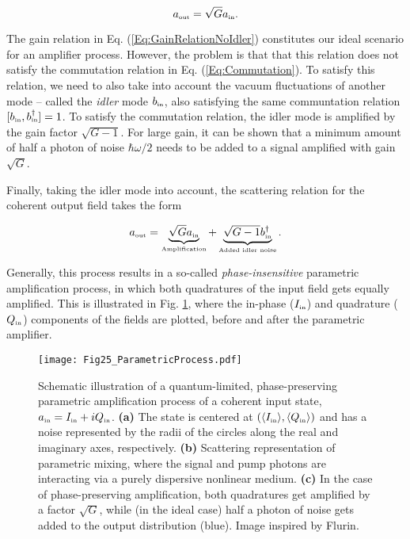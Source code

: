 \documentclass[aip,apr,twocolumn,showpacs,superscriptaddress,groupedaddress,nofootinbib,reprint]{revtex4-1}  %
\begin{document}
\begin{equation}
a_{\mbox{\tiny{out}}} = \sqrt{G}a_{\mbox{\tiny{in}}}.
\label{Eq:GainRelationNoIdler}
\end{equation}

The gain relation in Eq. (\ref{Eq:GainRelationNoIdler}) constitutes our ideal scenario for an amplifier process. However, the problem is that that this relation does not satisfy the commutation relation in Eq. (\ref{Eq:Commutation}). To satisfy this relation, we need to also take into account the vacuum fluctuations of another mode\cite{Shimoda1957,Clerk2003,Clerk2010,Bultink2018} -- called the \textit{idler} mode $b_{\mbox{\tiny{in}}}$, also satisfying the same communtation relation $[b_{\mbox{\tiny{in}}},b_{\mbox{\tiny{in}}}^{\dagger}] = 1$. To satisfy the commutation relation, the idler mode is amplified by the gain factor $\sqrt{G-1}$. For large gain, it can be shown that a minimum amount of half a photon of noise $\hbar \omega/2$ needs to be added to a signal amplified with gain $\sqrt{G}$.

Finally, taking the idler mode into account, the scattering relation for the coherent output field takes the form

\begin{equation}
a_{\mbox{\tiny{out}}} = \underbrace{\sqrt{G}a_{\mbox{\tiny{in}}}}_{\mbox{\tiny{Amplification}}} + \underbrace{\sqrt{G - 1}b_{\mbox{\tiny{in}}}^{\dagger}}_{\mbox{\tiny{Added idler noise}}}.
\label{Eq:GainRelation}
\end{equation}

Generally, this process results in a so-called \textit{phase-insensitive} parametric amplification process, in which both quadratures of the input field gets equally amplified. This is illustrated in Fig. \ref{Fig:ParaAmpProcess}, where the in-phase ($I_{\mbox{\tiny{in}}}$) and quadrature ($Q_{\mbox{\tiny{in}}}$) components of the fields are plotted, before and after the parametric amplifier.

\begin{figure*}[htp]
\begin{center}
\texttt{[image: Fig25\_ParametricProcess.pdf]}
\caption{Schematic illustration of a quantum-limited, phase-preserving parametric amplification process of a coherent input state, $a_{\mbox{\tiny{in}}} = I_{\mbox{\tiny{in}}} + iQ_{\mbox{\tiny{in}}}$. \textbf{(a)} The state is centered at $(\langle{I_{\mbox{\tiny{in}}}}\rangle,\langle{Q_{\mbox{\tiny{in}}}}\rangle)$ and has a noise represented by the radii of the circles along the real and imaginary axes, respectively. \textbf{(b)} Scattering representation of parametric mixing, where the signal and pump photons are interacting via a purely dispersive nonlinear medium. \textbf{(c)} In the case of phase-preserving amplification, both quadratures get amplified by a factor $\sqrt{G}$, while (in the ideal case) half a photon of noise gets added to the output distribution (blue). Image inspired by Flurin\cite{FlurinPhD2014}.}
\label{Fig:ParaAmpProcess}
\end{center}
\end{figure*}
\end{document}

